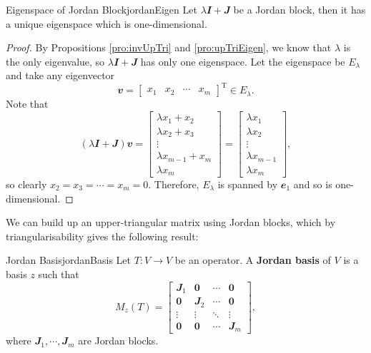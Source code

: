 \documentclass[math, code]{amznotes}
\theoremstyle{remark}
\newcommand{\zero}{\mathbf{0}}
\begin{document}
\begin{probox}{Eigenspace of Jordan Block}{jordanEigen}
    Let $\lambda\mathbfit{I} + \mathbfit{J}$ be a Jordan block, then it has a unique eigenspace which is one-dimensional.
    \tcblower
    \begin{proof}
        By Propositions \ref{pro:invUpTri} and \ref{pro:upTriEigen}, we know that $\lambda$ is the only eigenvalue, so $\lambda\mathbfit{I} + \mathbfit{J}$ has only one eigenspace. Let the eigenspace be $E_\lambda$ and take any eigenvector 
        \begin{equation*}
            \mathbfit{v} = \begin{bmatrix}
                x_1 & x_2 & \cdots & x_m
            \end{bmatrix}^{\mathrm{T}} \in E_\lambda.
        \end{equation*}
        Note that 
        \begin{equation*}
            (\lambda\mathbfit{I} + \mathbfit{J})\mathbfit{v} = \begin{bmatrix}
                \lambda x_1 + x_2 \\
                \lambda x_2 + x_3 \\
                \vdots \\
                \lambda x_{m - 1} + x_m \\
                \lambda x_m
            \end{bmatrix} = \begin{bmatrix}
                \lambda x_1 \\
                \lambda x_2 \\
                \vdots \\
                \lambda x_{m - 1} \\
                \lambda x_m
            \end{bmatrix},
        \end{equation*}
        so clearly $x_2 = x_3 = \cdots = x_m = 0$. Therefore, $E_\lambda$ is spanned by $\mathbfit{e}_1$ and so is one-dimensional.
    \end{proof}
\end{probox}
We can build up an upper-triangular matrix using Jordan blocks, which by triangularisability gives the following result:
\begin{dfnbox}{Jordan Basis}{jordanBasis}
    Let $T \colon V \to V$ be an operator. A {\color{red} \textbf{Jordan basis}} of $V$ is a basis $z$ such that 
    \begin{equation*}
        M_z(T) = \begin{bmatrix}
            \mathbfit{J}_1 & \zero & \cdots & \zero \\
            \zero & \mathbfit{J}_2 & \cdots & \zero \\
            \vdots & \vdots & \ddots & \vdots \\
            \zero & \zero & \cdots & \mathbfit{J}_m
        \end{bmatrix},
    \end{equation*}
    where $\mathbfit{J}_1, \cdots, \mathbfit{J}_m$ are Jordan blocks.
\end{dfnbox}
\end{document}
